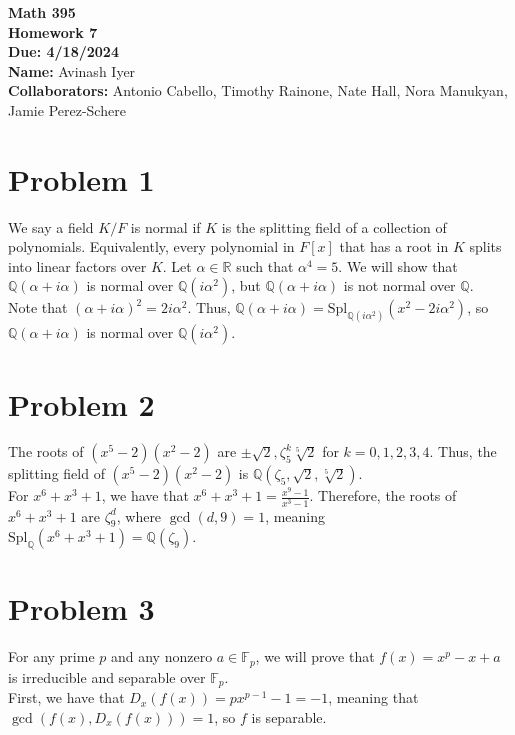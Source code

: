 \documentclass[11pt]{extarticle}
\title{}
\author{}
\date{}
\newcommand{\Q}{\mathbb{Q}}
\newcommand{\R}{\mathbb{R}}
\begin{document}
  \begin{center}
    {\bf \Large Math 395 \\[0.1in]Homework 7 \\[0.1in]
    Due: 4/18/2024}\\[.25in]
    {\bf Name:} {Avinash Iyer}\\[0.15in]
    {\bf Collaborators:} {Antonio Cabello, Timothy Rainone, Nate Hall, Nora Manukyan, Jamie Perez-Schere} \\
  \end{center}
  \section{Problem 1}%
  We say a field $K/F$ is normal if $K$ is the splitting field of a collection of polynomials. Equivalently, every polynomial in $F[x]$ that has a root in $K$ splits into linear factors over $K$. Let $\alpha\in \R$ such that $\alpha^4 = 5$. We will show that $\Q(\alpha + i\alpha)$ is normal over $\Q(i\alpha^2)$, but $\Q(\alpha + i\alpha)$ is not normal over $\Q$.\\

  Note that $(\alpha + i\alpha)^2 = 2i\alpha^2$. Thus, $\Q(\alpha + i\alpha) = \text{Spl}_{\Q(i\alpha^2)}(x^2 - 2i\alpha^2)$, so $\Q(\alpha + i\alpha)$ is normal over $\Q(i\alpha^2)$.
  \section{Problem 2}%
  The roots of $(x^5 - 2)(x^2 - 2)$ are $\pm\sqrt{2}, \zeta_5^{k}\sqrt[5]{2}$ for $k=0,1,2,3,4$. Thus, the splitting field of $(x^5 - 2)(x^2 - 2)$ is $\Q(\zeta_5,\sqrt{2},\sqrt[5]{2})$.\\

  For $x^6 + x^3 + 1$, we have that $x^6 + x^3 + 1 = \frac{x^9-1}{x^3 - 1}$. Therefore, the roots of $x^6 + x^3 + 1$ are $\zeta_9^{d}$, where $\gcd(d,9) = 1$, meaning $\text{Spl}_{\Q}(x^6 + x^3 + 1) = \Q(\zeta_9)$.
  \section{Problem 3}%
  For any prime $p$ and any nonzero $a\in \mathbb{F}_{p}$, we will prove that $f(x) = x^p - x + a$ is irreducible and separable over $\mathbb{F}_p$.\\

  First, we have that $D_x(f(x)) = px^{p-1} - 1 = -1$, meaning that $\gcd(f(x),D_x(f(x))) = 1$, so $f$ is separable.\\
\end{document}

